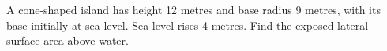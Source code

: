 A cone-shaped island has height 12 metres and base radius 9 metres, with its base initially at sea level. Sea level rises 4 metres. Find the exposed lateral surface area above water.
